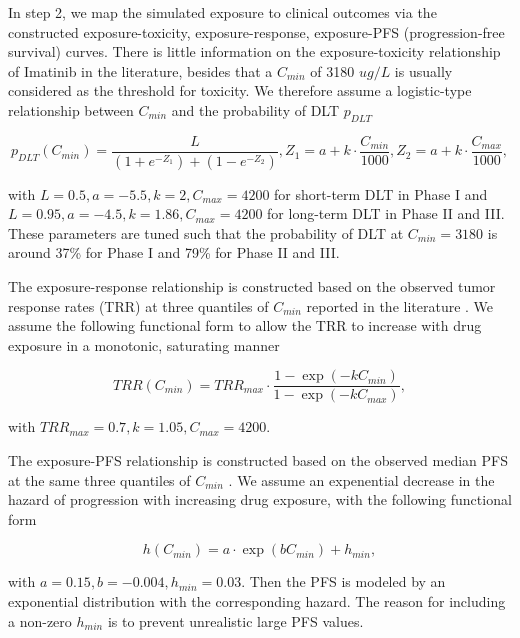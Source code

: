\documentclass[11pt]{article}
\begin{document}
In step 2,  we map the simulated exposure to clinical outcomes via the constructed exposure-toxicity, exposure-response, exposure-PFS (progression-free survival) curves. There is little information on the exposure-toxicity relationship of Imatinib in the literature, besides that a $C_{min}$ of 3180 $ug/L$ is usually considered as the threshold for toxicity. We therefore assume a logistic-type relationship between $C_{min}$ and the probability of DLT $p_{DLT}$

$$p_{DLT}(C_{min}) = \frac{L}{(1+e^{-Z_1})+(1-e^{-Z_2})}, Z_1 = a+k\cdot \frac{C_{min}}{1000}, Z_2 = a+k\cdot \frac{C_{max}}{1000},$$

with $L=0.5, a=-5.5, k=2, C_{max}=4200$ for short-term DLT in Phase I and $L=0.95, a=-4.5, k=1.86, C_{max}=4200$ for long-term DLT in Phase II and III. These parameters are tuned such that the probability of DLT at $C_{min}=3180$ is around 37\% for Phase I and 79\% for Phase II and III.

The exposure-response relationship is constructed based on the observed tumor response rates (TRR) at three quantiles of $C_{min}$ reported in the literature \parencite{demetri2009imatinib}. We assume the following functional form to allow the TRR to increase with drug exposure in a monotonic, saturating manner

$$TRR(C_{min}) = TRR_{max} \cdot \frac{1-\exp (-kC_{min})}{1-\exp (-kC_{max})},$$

with $TRR_{max}=0.7, k=1.05, C_{max}=4200$.

The exposure-PFS relationship is constructed based on the observed median PFS at the same three quantiles of $C_{min}$ \parencite{demetri2009imatinib}. We assume an expenential decrease in the hazard of progression with increasing drug exposure, with the following functional form

$$h(C_{min}) = a \cdot \exp (bC_{min})+h_{min},$$

with $a=0.15, b=-0.004, h_{min}=0.03$. Then the PFS is modeled by an exponential distribution with the corresponding hazard. The reason for including a non-zero $h_{min}$ is to prevent unrealistic large PFS values. 
\end{document}
